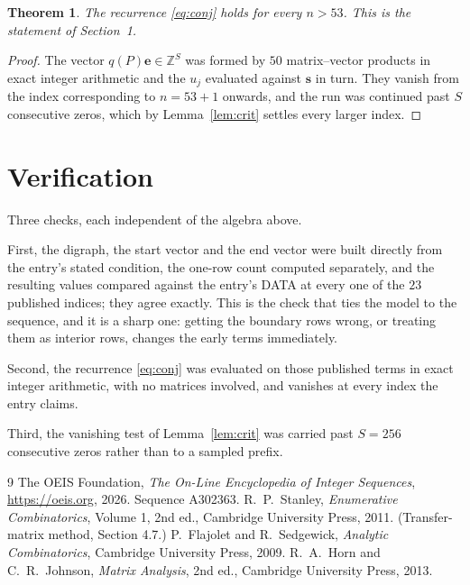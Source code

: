 \documentclass[11pt,a4paper]{article}
\theoremstyle{plain}
\newtheorem{theorem}{Theorem}
\theoremstyle{definition}
\begin{document}
\begin{theorem}
The recurrence \eqref{eq:conj} holds for every $n>53$. This is the statement of
Section~1.
\end{theorem}

\begin{proof}
The vector $q(P)\mathbf{e}\in\mathbb{Z}^{S}$ was formed by $50$ matrix--vector
products in exact integer arithmetic and the $u_j$ evaluated against $\mathbf{s}$ in turn.
They vanish from the index corresponding to $n=53+1$ onwards, and the run was continued
past $S$ consecutive zeros, which by Lemma~\ref{lem:crit} settles every larger index.
\end{proof}

\section{Verification}

Three checks, each independent of the algebra above.

First, the digraph, the start vector and the end vector were built directly from the
entry's stated condition, the one-row count computed separately, and the resulting values
compared against the entry's DATA at every one of the $23$ published indices; they
agree exactly. This is the check that ties the model to the sequence, and it is a sharp one:
getting the boundary rows wrong, or treating them as interior rows, changes the early terms
immediately.

Second, the recurrence \eqref{eq:conj} was evaluated on those published terms in exact
integer arithmetic, with no matrices involved, and vanishes at every index the entry claims.

Third, the vanishing test of Lemma~\ref{lem:crit} was carried past $S=256$ consecutive
zeros rather than to a sampled prefix.

\begin{thebibliography}{9}
 The OEIS Foundation, \emph{The On-Line Encyclopedia of Integer
Sequences}, \url{https://oeis.org}, 2026. Sequence A302363.
 R.~P.~Stanley, \emph{Enumerative Combinatorics}, Volume 1, 2nd ed.,
Cambridge University Press, 2011. (Transfer-matrix method, Section 4.7.)
 P.~Flajolet and R.~Sedgewick, \emph{Analytic Combinatorics}, Cambridge
University Press, 2009.
 R.~A.~Horn and C.~R.~Johnson, \emph{Matrix Analysis}, 2nd ed., Cambridge
University Press, 2013.
\end{thebibliography}
\end{document}
